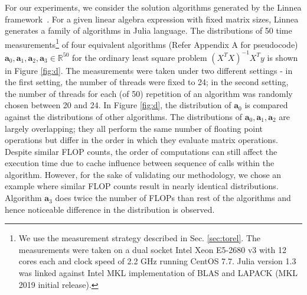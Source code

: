 \documentclass[conference]{IEEEtran}
\begin{document}
For our experiments, we consider the solution algorithms generated by the Linnea framework~\cite{barthels2019linnea}. For a given linear algebra expression with fixed matrix sizes, Linnea generates a family of algorithms in Julia language\cite{julia}.  The distributions of 50 time measurements\footnote{We use the measurement strategy described in Sec. \ref{sec:torel}. The measurements were taken on a dual  socket Intel Xeon E5-2680 v3 with 12 cores each and clock speed of 2.2 GHz running CentOS 7.7. Julia version 1.3 was linked against Intel MKL implementation of BLAS and LAPACK (MKL 2019 initial release).} of four equivalent algorithms (Refer Appendix A for pseudocode) $\mathbf{a}_0, \mathbf{a}_1, \mathbf{a}_2, \mathbf{a}_3 \in \mathbb{R}^{50}$ for the ordinary least square problem  $(X^TX)^{-1}X^{T}y$ is shown in Figure \ref{fig:d}. The measurements were taken under two different settings - in the first setting, the number of threads were fixed to 24; in the second setting, the number of threads for each (of 50) repetition of an algorithm was randomly chosen between 20 and 24. In Figure \ref{fig:d}, the distribution of $\mathbf{a}_0$ is compared against the distributions of other algorithms.  The distributions of $\mathbf{a}_0, \mathbf{a}_1, \mathbf{a}_2$ are largely overlapping; they all perform the same number of floating point operations but differ in the order in which they evaluate matrix operations. Despite similar FLOP counts, the order of computations can still affect the execution time due to cache influence between sequence of calls within the algorithm\cite{peise2014cache}. However, for the sake of validating our methodology, we chose an example where similar FLOP counts result in nearly identical distributions. Algorithm $\mathbf{a}_3$ does twice the number of FLOPs than rest of the algorithms and hence noticeable difference in the distribution is observed.
\end{document}
